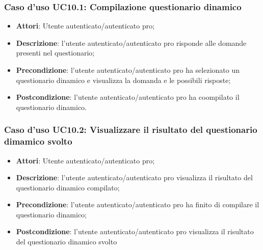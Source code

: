 \subsubsection{Caso d'uso UC10.1: Compilazione questionario dinamico}
\begin{itemize}
	\item \textbf{Attori}: Utente autenticato/autenticato pro;
	\item \textbf{Descrizione}: l'utente autenticato/autenticato pro risponde alle domande presenti nel questionario;
	\item \textbf{Precondizione}: l'utente autenticato/autenticato pro ha selezionato un questionario dinamico e visualizza la domanda e le possibili risposte;
	\item \textbf{Postcondizione}: l'utente autenticato/autenticato pro ha coompilato il questionario dinamico.
\end{itemize}
\subsubsection{Caso d'uso UC10.2: Visualizzare il risultato del questionario dimamico svolto}
\begin{itemize}
	\item \textbf{Attori}: Utente autenticato/autenticato pro;
	\item \textbf{Descrizione}: l'utente autenticato/autenticato pro visualizza il risultato del questionario dinamico compilato;
	\item \textbf{Precondizione}: l'utente autenticato/autenticato pro ha finito di compilare il questionario dinamico;
	\item \textbf{Postcondizione}: l'utente autenticato/autenticato pro visualizza il risultato del questionario dinamico svolto 
\end{itemize}

